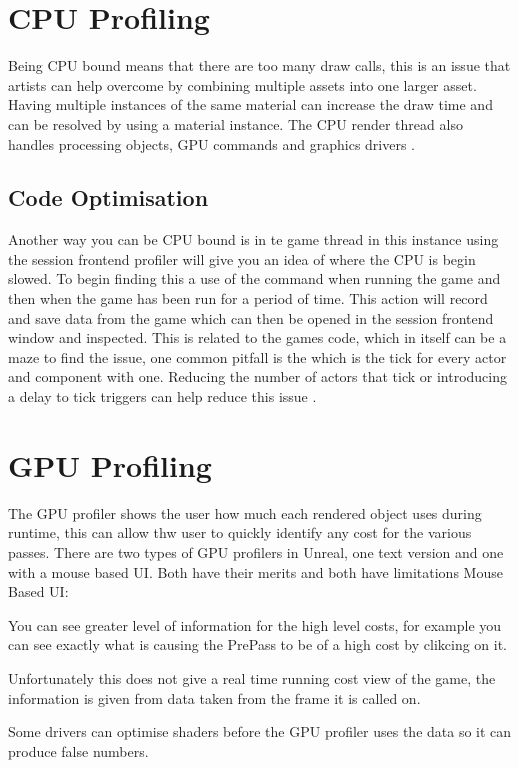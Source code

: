 \documentclass{scrartcl}
\begin{document}
\section{CPU Profiling}
Being CPU bound means that there are too many draw calls, this is an issue that artists can help overcome by combining multiple assets into one larger asset. Having multiple instances of the same material can increase the draw time and can be resolved by using a material instance. The CPU render thread also handles processing objects, GPU commands and graphics drivers \cite{UECPU}.

\subsection{Code Optimisation}
Another way you can be CPU bound is in te game thread in this instance using the session frontend profiler will give you an idea of where the CPU is begin slowed. To begin finding this a use of the command  when running the game and then  when the game has been run for a period of time. This action will record and save data from the game which can then be opened in the session frontend window and inspected. This is related to the games code, which in itself can be a maze to find the issue, one common pitfall is the  which is the tick for every actor and component with one. Reducing the number of actors that tick or introducing a delay to tick triggers can help reduce this issue \cite{BlogUnreal}.

\section{GPU Profiling}
The GPU profiler shows the user how much each rendered object uses during runtime, this can allow thw user to quickly identify any cost for the various passes. There are two types of GPU profilers in Unreal, one text version and one with a mouse based UI. Both have their merits and both have limitations
\newline
Mouse Based UI:
\begin{description}[font=$\bullet$~\normalfont\scshape\color{red!50!black}]
\item You can see greater level of information for the high level costs, for example you can see exactly what is causing the PrePass to be of a high cost by clikcing on it.
\item Unfortunately this does not give a real time running cost view of the game, the information is given from data taken from the frame it is called on.
\item Some drivers can optimise shaders before the GPU profiler uses the data so it can produce false numbers.
\end{description}
\end{document}
